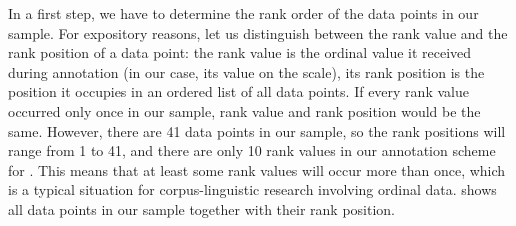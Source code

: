 In a first step, we have to determine the rank order of the data points in our sample. For expository reasons, let us distinguish between the rank value and the rank position of a data point: the rank value is the ordinal  value it received during annotation  (in our case, its value on the  scale), its rank position is the position it occupies in an ordered list of all data points. If every rank value occurred only once in our sample, rank value and rank position would be the same. However, there are 41 data points in our sample, so the rank positions will range from 1 to 41, and there are only 10 rank values in our annotation  scheme for .  This means that at least some rank values will occur more than once, which is a typical situation for corpus\hyp{}linguistic research involving ordinal  data.
 shows all data points in our sample together with their rank position.

